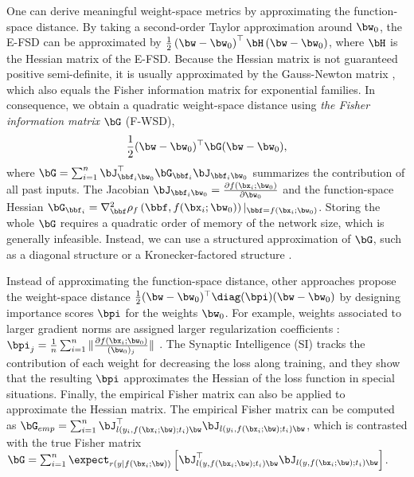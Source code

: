One can derive meaningful weight-space metrics by approximating the function-space distance. By taking a second-order Taylor approximation around $\bw_0$, the E-FSD can be approximated by $\frac{1}{2} \left(\bw - \bw_0\right)^{\top} \bH \left(\bw - \bw_0\right)$, where $\bH$ is the Hessian matrix of the E-FSD. Because the Hessian matrix is not guaranteed positive semi-definite, it is usually approximated by the Gauss-Newton matrix \citep{schraudolph2002fast}, which also equals the Fisher information matrix \citep{amari2001information} for exponential families. In consequence, we obtain a quadratic weight-space distance using \emph{the Fisher information matrix} $\bG$ (F-WSD),
\begin{align}
    \frac{1}{2}(\bw - \bw_0)^{\top} \bG (\bw - \bw_0),
\end{align}
where $\bG = \sum_{i=1}^n \bJ_{\bbf_i\bw_0}^{\top}\bG_{\bbf_i}\bJ_{\bbf_i\bw_0}$ summarizes the contribution of all past inputs. The Jacobian $\bJ_{\bbf_i\bw_0} = \frac{\partial f(\bx_i; \bw_0)}{\partial \bw_0}$ and the function-space Hessian $\bG_{\bbf_i} = \nabla_{\bbf}^2 \rho_f\left(\bbf, f(\bx_i; \bw_0)\right)\vert_{\bbf=f(\bx_i; \bw_0)}$. Storing the whole $\bG$ requires a quadratic order of memory of the network size, which is generally infeasible. Instead, we can use a structured approximation of $\bG$, such as a diagonal structure \citep{kirkpatrick2017overcoming} or a Kronecker-factored structure \citep{ritter2018online}.

Instead of approximating the function-space distance, other approaches propose the weight-space distance $\frac{1}{2}(\bw - \bw_0)^{\top} \diag(\bpi) (\bw - \bw_0) $ by designing importance scores $\bpi$ for the weights $\bw_0$. For example, weights associated to larger gradient norms are assigned larger regularization coefficients : $\bpi_j = \frac{1}{n} \sum_{i=1}^n \| \frac{\partial f(\bx_i; \bw_0)}{(\bw_0)_j} \|$ \citep{aljundi2018memory}. The Synaptic Intelligence (SI) \citep{zenke2017continual} tracks the contribution of each weight for decreasing the loss along training, and they show that the resulting $\bpi$ approximates the Hessian of the loss function in special situations. Finally, the empirical Fisher matrix \citep{martens2020new} can also be applied to approximate the Hessian matrix. The empirical Fisher matrix can be computed as $\bG_{emp} = \sum_{i=1}^n \bJ_{l(y_i, f(\bx_i; \bw); t_i)\bw}^{\top} \bJ_{l(y_i, f(\bx_i; \bw); t_i)\bw}$, which is contrasted with the true Fisher matrix $\bG = \sum_{i=1}^n  \expect_{r(y|f(\bx_i; \bw))} \left[\bJ_{l(y, f(\bx_i; \bw); t_i)\bw}^{\top} \bJ_{l(y, f(\bx_i; \bw); t_i)\bw}\right]$.

